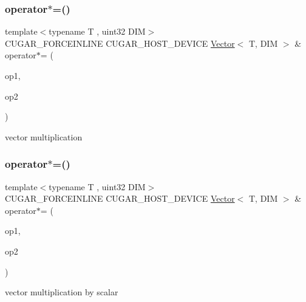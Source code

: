 \subsubsection{\texorpdfstring{operator$\ast$=()}{operator*=()}\hspace{0.1cm}{\footnotesize\ttfamily [1/2]}}
{\footnotesize\ttfamily template$<$typename T , uint32 D\+IM$>$ \\
C\+U\+G\+A\+R\+\_\+\+F\+O\+R\+C\+E\+I\+N\+L\+I\+NE C\+U\+G\+A\+R\+\_\+\+H\+O\+S\+T\+\_\+\+D\+E\+V\+I\+CE \hyperlink{structcugar_1_1_vector}{Vector}$<$ T, D\+IM $>$ \& operator$\ast$= (\begin{DoxyParamCaption}\item[{\hyperlink{structcugar_1_1_vector}{Vector}$<$ T, D\+IM $>$ \&}]{op1,  }\item[{const \hyperlink{structcugar_1_1_vector}{Vector}$<$ T, D\+IM $>$ \&}]{op2 }\end{DoxyParamCaption})\hspace{0.3cm}{\ttfamily [related]}}

vector multiplication \mbox{\label{group___vectors_module_ga382f555725b86158c670437a5a4d3043}} 
\subsubsection{\texorpdfstring{operator$\ast$=()}{operator*=()}\hspace{0.1cm}{\footnotesize\ttfamily [2/2]}}
{\footnotesize\ttfamily template$<$typename T , uint32 D\+IM$>$ \\
C\+U\+G\+A\+R\+\_\+\+F\+O\+R\+C\+E\+I\+N\+L\+I\+NE C\+U\+G\+A\+R\+\_\+\+H\+O\+S\+T\+\_\+\+D\+E\+V\+I\+CE \hyperlink{structcugar_1_1_vector}{Vector}$<$ T, D\+IM $>$ \& operator$\ast$= (\begin{DoxyParamCaption}\item[{\hyperlink{structcugar_1_1_vector}{Vector}$<$ T, D\+IM $>$ \&}]{op1,  }\item[{const T}]{op2 }\end{DoxyParamCaption})\hspace{0.3cm}{\ttfamily [related]}}

vector multiplication by scalar \mbox{\label{group___vectors_module_ga489fb43a70bf29d1770cfe886bc225f2}} 
